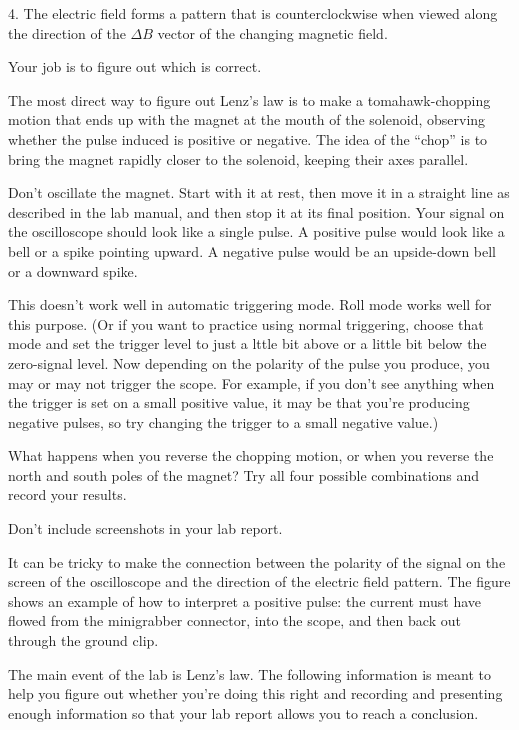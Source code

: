 4. The electric field forms a pattern that is counterclockwise
when viewed along the direction of the $\Delta B$ vector of
the changing magnetic field.

Your job is to figure out which is correct.

The most direct way to figure out Lenz's law is to 
make a tomahawk-chopping motion that ends up with the magnet at the mouth of the solenoid,
observing whether the pulse induced is positive or negative.
The idea of the ``chop'' is to bring the magnet rapidly closer
to the solenoid, keeping their axes parallel.

Don't oscillate	the magnet. Start with it at rest, then	move it	in
a straight line	as described in	the lab	manual,	and then stop it at
its final position. Your signal	on the oscilloscope should look	like
a single pulse.	A positive pulse would look like a bell	or a spike
pointing upward. A negative pulse would	be an upside-down bell or
a downward spike.

This doesn't work well in automatic triggering mode. Roll mode works
well for this purpose. (Or if you want to practice using normal
triggering, choose that mode and set the trigger level to just a lttle
bit above or a little bit below the zero-signal level. Now depending
on the polarity of the pulse you produce, you may or may not trigger
the scope. For example, if you don't see anything when the trigger is
set on a small positive value, it may be that you're producing
negative pulses, so try changing the trigger to a small negative
value.)

What happens when you reverse the
chopping motion, or when you reverse the north and south
poles of the magnet? Try all four possible combinations and
record your results.

Don't include screenshots in your lab report.


It can be tricky to make the connection between the polarity
of the signal on the screen of the oscilloscope and the
direction of the electric field pattern. The figure shows an
example of how to interpret a positive pulse: the current
must have flowed from the minigrabber connector, into the
scope, and then back out through the ground clip.

\analysis

The main event of the lab is Lenz's law. The following information
is meant to help you figure out whether you're doing this right and
recording and presenting enough information so that your lab report
allows you to reach a conclusion.

